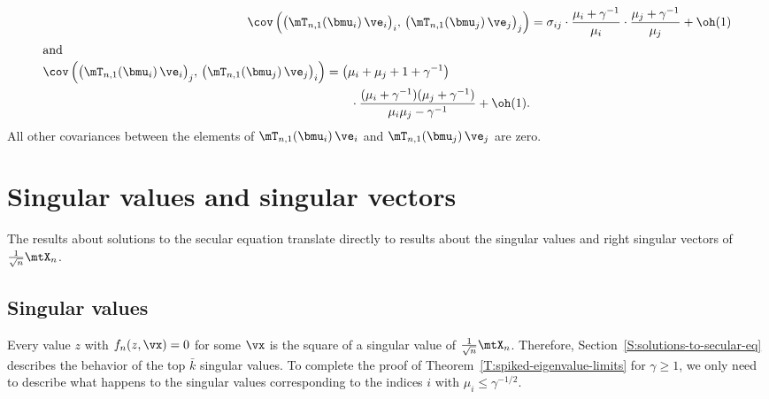 \begin{subequations}
\begin{align}
    \cov \left( 
        \big(
            \mT_{n,1}( \bmu_i ) \,
            \ve_i
        \big)_i, \,
        \big(
            \mT_{n,1}( \bmu_j ) \,
            \ve_j
        \big)_j
    \right)
        &=
        \sigma_{ij}
        \cdot
        \frac{\mu_i + \gamma^{-1}}{ \mu_i }
        \cdot
        \frac{\mu_j + \gamma^{-1}}{ \mu_j } + \oh(1) \\
\intertext{and}
    \begin{split}
    \cov \left(
        \big(
            \mT_{n,1}( \bmu_i ) \,
            \ve_i
        \big)_j, \,
        \big(
            \mT_{n,1}( \bmu_j ) \,
            \ve_j
        \big)_i    
    \right)
        &=
        \left(
            \mu_i + \mu_j + 1 + \gamma^{-1}
        \right) \\
        &\qquad \cdot
            \frac{ ( \mu_i + \gamma^{-1} )( \mu_j + \gamma^{-1} ) }
                 { \mu_i \mu_j - \gamma^{-1} }
        + \oh(1).
    \end{split}
\end{align}
\end{subequations}
All other covariances between the elements of
$\mT_{n,1}(\bmu_i) \, \ve_i$ and $\mT_{n,1}(\bmu_j) \, \ve_j$ are zero.

\section{Singular values and singular vectors}\label{S:singular-values-and-vectors}

The results about solutions to the secular equation translate directly
to results about the singular values and right singular vectors of
$\frac{1}{\sqrt{n}} \mtX_n$.

\subsection{Singular values}

Every value $z$ with $f_n(z, \vx) = 0$ for some $\vx$ is the square of a
singular value of $\frac{1}{\sqrt{n}} \mtX_n$.  Therefore,  Section~\ref{S:solutions-to-secular-eq} describes the behavior of the top $\bar k$ singular values.  To complete the proof of Theorem~\ref{T:spiked-eigenvalue-limits} for $\gamma \geq 1$, we only need to describe what happens to the singular values corresponding to the indices $i$ with $\mu_i \leq \gamma^{-1/2}$.

